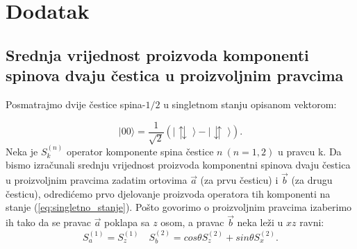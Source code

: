 \chapter{Dodatak}
\section{Srednja vrijednost proizvoda komponenti spinova dvaju \v cestica u proizvoljnim pravcima}

Posmatrajmo dvije čestice spina-$1/2$ u singletnom stanju opisanom vektorom:

\begin{equation}
    | 00 \rangle = \frac{1}{\sqrt2}(| \updownarrows \; \rangle - | \downuparrows \; \rangle) \label{eq:singletno_stanje}.
\end{equation}
Neka je $S_k^{(n)}$ operator komponente spina čestice $n \ (n = 1, 2)$ u pravcu k. Da bismo izračunali srednju vrijednost proizvoda komponentni spinova dvaju čestica u proizvoljnim pravcima zadatim ortovima $\vec{a}$ (za prvu česticu) i $\vec{b}$ (za drugu česticu), odredićemo prvo djelovanje proizvoda operatora tih komponenti na stanje (\ref{eq:singletno_stanje}).
Pošto govorimo o proizvoljnim pravcima izaberimo ih tako da se pravac $\vec{a}$ poklapa sa $z$ osom, a pravac $\vec{b}$ neka leži u $xz$ ravni:
\begin{equation*}
    S_a^{(1)} = S_z^{(1)} \quad S_b^{(2)} = cos{\theta} S_z^{(2)} + sin{\theta} S_x^{(2)}.
\end{equation*}



